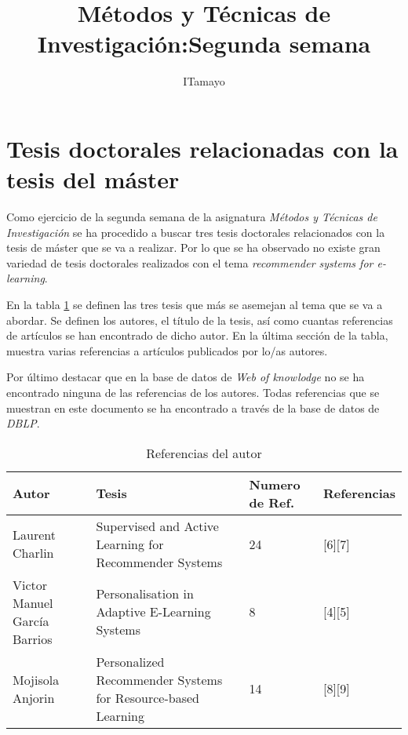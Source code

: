 \documentclass[]{article}
\title{Métodos y Técnicas de Investigación:Segunda semana}
\author{I\ñigo Tamayo}
\begin{document}
\section{Tesis doctorales relacionadas con la tesis del máster}

Como ejercicio de la segunda semana de la asignatura \textit{Métodos y Técnicas de Investigación} se ha procedido a buscar tres tesis doctorales relacionados con la tesis de máster que se va a realizar. Por lo que se ha observado no existe gran variedad de tesis doctorales realizados con el tema \textit{recommender systems for e-learning}.

En la tabla \ref{Descriptivo} se definen las tres tesis que más se asemejan al tema que se va a abordar. Se definen los autores, el título de la tesis, así como cuantas referencias de artículos se han encontrado de dicho autor. En la última sección de la tabla, muestra varias referencias a artículos publicados por lo/as autores.

Por último destacar que en la base de datos de \textit{Web of knowlodge} no se ha encontrado ninguna de las referencias de los autores. Todas referencias que se muestran en este documento se ha encontrado a través de la base de datos de \textit{DBLP}. 

\begin{table}[h]
	\centering
	\caption{Referencias del autor}
	\label{Descriptivo}
	\begin{tabular}{| l | p{5cm} | l | p{2cm}|}
		\hline
		Autor & Tesis & Numero de Ref. & Referencias  \\ \hline
		Laurent Charlin &Supervised and Active Learning for Recommender Systems  & 24 & [6][7] \\ \hline 
		Victor Manuel García Barrios & Personalisation in Adaptive E-Learning 
		Systems &  8 & [4][5]  \\ \hline   
		Mojisola Anjorin & Personalized Recommender Systems for Resource-based Learning & 14 & [8][9]  \\ \hline
	\end{tabular}
\end{table}
\end{document}
